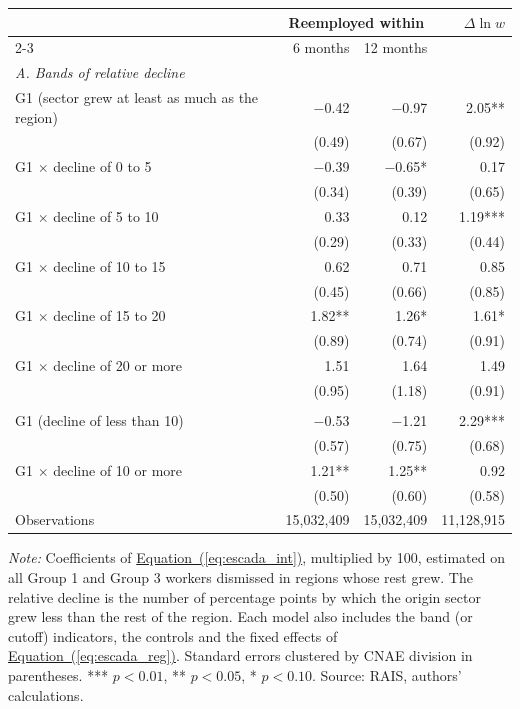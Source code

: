{\footnotesize
\begin{threeparttable}
\begin{tabular}{lrrr}
\toprule
 & \multicolumn{2}{c}{Reemployed within} & $\Delta \ln w$ \\
\cmidrule(lr){2-3}
 & 6 months & 12 months & \\
\midrule
\multicolumn{4}{l}{\textit{A. Bands of relative decline}} \\
G1 (sector grew at least as much as the region) & $-$0.42 & $-$0.97 & 2.05** \\
 & (0.49) & (0.67) & (0.92) \\
G1 $\times$ decline of 0 to 5 & $-$0.39 & $-$0.65* & 0.17 \\
 & (0.34) & (0.39) & (0.65) \\
G1 $\times$ decline of 5 to 10 & 0.33 & 0.12 & 1.19*** \\
 & (0.29) & (0.33) & (0.44) \\
G1 $\times$ decline of 10 to 15 & 0.62 & 0.71 & 0.85 \\
 & (0.45) & (0.66) & (0.85) \\
G1 $\times$ decline of 15 to 20 & 1.82** & 1.26* & 1.61* \\
 & (0.89) & (0.74) & (0.91) \\
G1 $\times$ decline of 20 or more & 1.51 & 1.64 & 1.49 \\
 & (0.95) & (1.18) & (0.91) \\
\addlinespace[3pt]
\multicolumn{4}{l}{\textit{B. Single cutoff at 10 points}} \\
G1 (decline of less than 10) & $-$0.53 & $-$1.21 & 2.29*** \\
 & (0.57) & (0.75) & (0.68) \\
G1 $\times$ decline of 10 or more & 1.21** & 1.25** & 0.92 \\
 & (0.50) & (0.60) & (0.58) \\
\midrule
Observations & 15,032,409 & 15,032,409 & 11,128,915 \\
\bottomrule
\end{tabular}
\begin{tablenotes}[flushleft]\footnotesize
\item \textit{Note:} Coefficients of \hyperref[eq:escada_int]{Equation~(\ref*{eq:escada_int})}, multiplied by 100, estimated on all Group 1 and Group 3 workers dismissed in regions whose rest grew. The relative decline is the number of percentage points by which the origin sector grew less than the rest of the region. Each model also includes the band (or cutoff) indicators, the controls and the fixed effects of \hyperref[eq:escada_reg]{Equation~(\ref*{eq:escada_reg})}. Standard errors clustered by CNAE division in parentheses. *** $p<0.01$, ** $p<0.05$, * $p<0.10$. Source: RAIS, authors' calculations.
\end{tablenotes}
\end{threeparttable}
}

